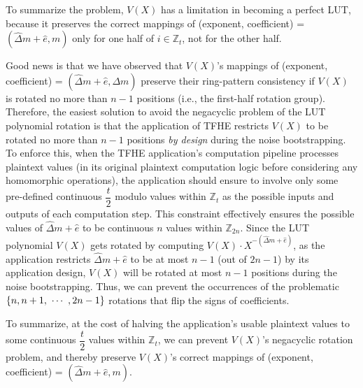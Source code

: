 To summarize the problem, $V(X)$ has a limitation in becoming a perfect LUT, because it preserves the correct mappings of (exponent, coefficient) = $(\hat{\Delta} m + \hat{e}, m)$ only for one half of $i \in \mathbb{Z}_t$, not for the other half. 

Good news is that we have observed that $V(X)$'s mappings of (exponent, coefficient) = $(\hat{\Delta} m + \hat e, \Delta m)$ preserve their ring-pattern consistency if $V(X)$ is rotated no more than $n-1$ positions (i.e., the first-half rotation group). Therefore, the easiest solution to avoid the negacyclic problem of the LUT polynomial rotation is that the application of TFHE restricts $V(X)$ to be rotated no more than $n-1$ positions \textit{by design} during the noise bootstrapping. To enforce this, when the TFHE application's computation pipeline processes plaintext values (in its original plaintext computation logic before considering any homomorphic operations), the application should ensure to involve only some pre-defined continuous $\dfrac{t}{2}$ modulo values within $\mathbb{Z}_t$ as the possible inputs and outputs of each computation step. This constraint effectively ensures the possible values of $\hat\Delta m + \hat e$ to be continuous $n$ values within $\mathbb{Z}_{2n}$. Since the LUT polynomial $V(X)$ gets rotated by computing $V(X)\cdot X^{-(\hat\Delta m + \hat e)}$, as the application restricts $\hat\Delta m + \hat e$ to be at most $n-1$ (out of $2n - 1$) by its application design, $V(X)$ will be rotated at most $n-1$ positions during the noise bootstrapping. Thus, we can prevent the occurrences of the problematic $\{n, n+1, \text{ } \text{$\cdots$} \text{ }, 2n -1 \}$ rotations that flip the signs of coefficients.  

To summarize, at the cost of halving the application's usable plaintext values to some continuous $\dfrac{t}{2}$ values within $\mathbb{Z}_t$, we can prevent $V(X)$'s negacyclic rotation problem, and thereby preserve $V(X)$'s correct mappings of (exponent, coefficient) = $(\hat{\Delta} m + \hat e, m)$.


